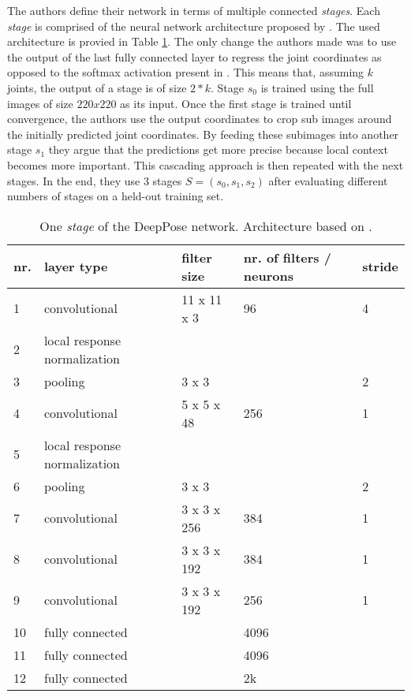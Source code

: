 The authors define their network in terms of multiple connected \textit{stages}.
Each \textit{stage} is comprised of the neural network architecture proposed by \cite{krizhevsky_imagenet_2012}.
The used architecture is provied in Table \ref{tab:deeppose-architecture}.
The only change the authors made was to use the output of the last fully connected layer to regress the joint coordinates as opposed to the softmax activation present in \cite{krizhevsky_imagenet_2012}.
This means that, assuming $k$ joints, the output of a stage is of size $2 * k$.
Stage $s_0$ is trained using the full images of size $220 x 220$ as its input.
Once the first stage is trained until convergence, the authors use the output coordinates to crop sub images around the initially predicted joint coordinates.
By feeding these subimages into another stage $s_1$ they argue that the predictions get more precise because local context becomes more important.
This cascading approach is then repeated with the next stages.
In the end, they use $3$ stages $S = (s_0, s_1, s_2)$ after evaluating different numbers of stages on a held-out training set.

\begin{table}[]
    \centering
    \begin{tabular}{|l|l|l|l|l|}
    \hline
    \textbf{nr.} & \textbf{layer type} & \textbf{filter size} & \textbf{nr. of filters / neurons} & \textbf{stride} \\ \hline
    1 & convolutional & 11 x 11 x 3 & 96 & 4 \\
    2 & local response normalization &  &  &  \\
    3 & pooling & 3 x 3 &  & 2 \\ \hline
    4 & convolutional & 5 x 5 x 48 & 256 & 1 \\
    5 & local response normalization &  &  &  \\ 
    6 & pooling & 3 x 3 &  & 2 \\ \hline
    7 & convolutional & 3 x 3 x 256 & 384 & 1 \\
    8 & convolutional & 3 x 3 x 192 & 384 & 1 \\
    9 & convolutional & 3 x 3 x 192 & 256 & 1 \\ \hline
    10 & fully connected &  & 4096 &  \\
    11 & fully connected &  & 4096 &  \\ \hline
    12 & fully connected &  & 2k &  \\ \hline
    \end{tabular}
    \caption{One \textit{stage} of the DeepPose network. Architecture based on \cite{krizhevsky_imagenet_2012}.}
    \label{tab:deeppose-architecture}
\end{table}

